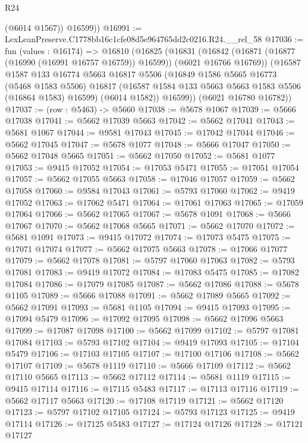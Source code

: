 \begin{lexlean}{R24}
\begin{coremodule}
          (@6014 @1567))
        @16599))
@16991 := LexLeanPreserve.C1778bb16c1cfe08d5e964765dd2c0216.R24.__rel_58
@17036 := fun (values : @16174) =>
  @16810
    (@16825
      (@16831
        (@16842 (@16871 (@16877 (@16990 (@16991 @16757 @16759)) @16599)) (@6021 @16766 @16769))
        (@16587
          @1587
          @133
          @16774
          @5663
          @16817
          @5506
          (@16849
            @1586
            @5665
            @16773
            (@5468 @1583 @5506)
            @16817
            (@16587 @1584 @133 @5663 @5663 @1583 @5506 (@16864 @1583) @16599)
            (@6014 @1582))
          @16599))
      (@6021 @16780 @16782))
@17037 := (row : @5463) -> @5660
@17038 := @5678 @1067
@17039 := @5666 @17038
@17041 := @5662 @17039 @5663
@17042 := @5662 @17041
@17043 := @5681 @1067
@17044 := @9581 @17043
@17045 := @17042 @17044
@17046 := @5662 @17045
@17047 := @5678 @1077
@17048 := @5666 @17047
@17050 := @5662 @17048 @5665
@17051 := @5662 @17050
@17052 := @5681 @1077
@17053 := @9415 @17052
@17054 := @17053 @5471
@17055 := @17051 @17054
@17057 := @5662 @17055 @5663
@17058 := @17046 @17057
@17059 := @5662 @17058
@17060 := @9584 @17043
@17061 := @5793 @17060
@17062 := @9419 @17052
@17063 := @17062 @5471
@17064 := @17061 @17063
@17065 := @17059 @17064
@17066 := @5662 @17065
@17067 := @5678 @1091
@17068 := @5666 @17067
@17070 := @5662 @17068 @5665
@17071 := @5662 @17070
@17072 := @5681 @1091
@17073 := @9415 @17072
@17074 := @17073 @5475
@17075 := @17071 @17074
@17077 := @5662 @17075 @5663
@17078 := @17066 @17077
@17079 := @5662 @17078
@17081 := @5797 @17060 @17063
@17082 := @5793 @17081
@17083 := @9419 @17072
@17084 := @17083 @5475
@17085 := @17082 @17084
@17086 := @17079 @17085
@17087 := @5662 @17086
@17088 := @5678 @1105
@17089 := @5666 @17088
@17091 := @5662 @17089 @5665
@17092 := @5662 @17091
@17093 := @5681 @1105
@17094 := @9415 @17093
@17095 := @17094 @5479
@17096 := @17092 @17095
@17098 := @5662 @17096 @5663
@17099 := @17087 @17098
@17100 := @5662 @17099
@17102 := @5797 @17081 @17084
@17103 := @5793 @17102
@17104 := @9419 @17093
@17105 := @17104 @5479
@17106 := @17103 @17105
@17107 := @17100 @17106
@17108 := @5662 @17107
@17109 := @5678 @1119
@17110 := @5666 @17109
@17112 := @5662 @17110 @5665
@17113 := @5662 @17112
@17114 := @5681 @1119
@17115 := @9415 @17114
@17116 := @17115 @5483
@17117 := @17113 @17116
@17119 := @5662 @17117 @5663
@17120 := @17108 @17119
@17121 := @5662 @17120
@17123 := @5797 @17102 @17105
@17124 := @5793 @17123
@17125 := @9419 @17114
@17126 := @17125 @5483
@17127 := @17124 @17126
@17128 := @17121 @17127

\end{coremodule}
\end{lexlean}
